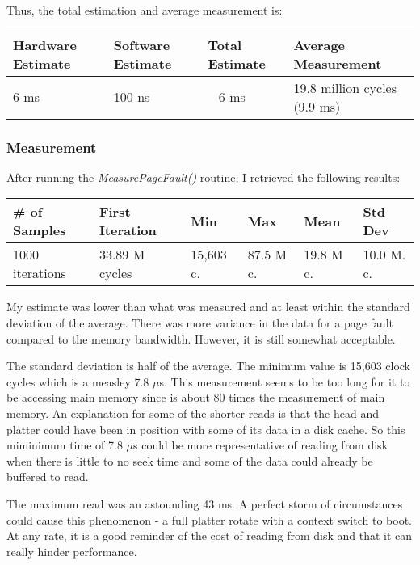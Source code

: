 \documentclass[paper=a4, fontsize=11pt]{scrartcl}
\numberwithin{equation}{section}        %
\numberwithin{figure}{section}          %
\numberwithin{table}{section}               %
\begin{document}
Thus, the total estimation and average measurement is:


\begin{center}
    \begin{tabular}{ | l | l | l | l |}
    \hline
    Hardware Estimate & Software Estimate & Total Estimate & Average Measurement \\      \hline
    6 ms & 100 ns & ~ 6 ms & 19.8 million cycles (9.9 ms) \\ 
    \hline
    \end{tabular}
\end{center}

\subsubsection{Measurement}

After running the \textit{MeasurePageFault()} routine, I retrieved the following results:

\begin{center}
    \begin{tabular}{ | l | l | l | l | l | l |}
    \hline
    \# of Samples & First Iteration & Min & Max & Mean & Std Dev \\
    \hline
    1000 iterations & 33.89 M cycles & 15,603 c. & 87.5 M c. & 19.8 M c. & 10.0 M. c. \\ 
    \hline
    \end{tabular}
\end{center}

My estimate was lower than what was measured and at least within the standard deviation of the average.  There was more variance in the data for a page fault compared to the memory bandwidth.  However, it is still somewhat acceptable.

The standard deviation is half of the average.  The minimum value is 15,603 clock cycles which is a measley 7.8 $\mu$s.  This measurement seems to be too long for it to be accessing main memory since is about 80 times the measurement of main memory.  An explanation for some of the shorter reads is that the head and platter could have been in position with some of its data in a disk cache.  So this miminimum time of 7.8 $\mu$s could be more representative of reading from disk when there is little to no seek time and some of the data could already be buffered to read.

The maximum read was an astounding 43 ms.  A perfect storm of circumstances could cause this phenomenon - a full platter rotate with a context switch to boot.  At any rate, it is a good reminder of the cost of reading from disk and that it can really hinder performance.
\end{document}
